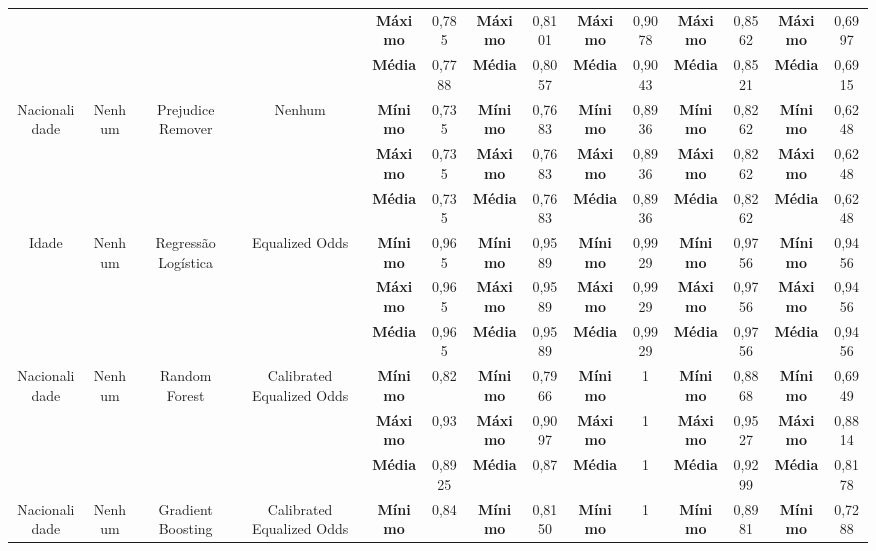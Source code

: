 \documentclass[Portugues,Final]{ic-tese-v3}
\begin{document}
\begin{table}[H]
\begin{center}
{\begin{tabular}{c|c|c|c|c|c|c|c|c|c|c|c|c|c}
             & & & & \textbf{Máximo} & 0,785 & \textbf{Máximo} & 0,8101 & \textbf{Máximo} & 0,9078 & \textbf{Máximo} & 0,8562 & \textbf{Máximo} & 0,6997 \\
             & & & & \textbf{Média} & 0,7788 & \textbf{Média} & 0,8057 & \textbf{Média} & 0,9043 & \textbf{Média} & 0,8521 & \textbf{Média} & 0,6915 \\
            \hline
            \multirow{3}{*}{Nacionalidade} & \multirow{3}{*}{Nenhum} & \multirow{3}{*}{Prejudice Remover} & \multirow{3}{*}{Nenhum} & \textbf{Mínimo} & 0,735 & \textbf{Mínimo} & 0,7683 & \textbf{Mínimo} & 0,8936 & \textbf{Mínimo} & 0,8262 & \textbf{Mínimo} & 0,6248 \\
             & & & & \textbf{Máximo} & 0,735 & \textbf{Máximo} & 0,7683 & \textbf{Máximo} & 0,8936 & \textbf{Máximo} & 0,8262 & \textbf{Máximo} & 0,6248 \\
             & & & & \textbf{Média} & 0,735 & \textbf{Média} & 0,7683 & \textbf{Média} & 0,8936 & \textbf{Média} & 0,8262 & \textbf{Média} & 0,6248 \\
            \hline
            \multirow{3}{*}{Idade} & \multirow{3}{*}{Nenhum} & \multirow{3}{*}{Regressão Logística} & \multirow{3}{*}{Equalized Odds} & \textbf{Mínimo} & 0,965 & \textbf{Mínimo} & 0,9589 & \textbf{Mínimo} & 0,9929 & \textbf{Mínimo} & 0,9756 & \textbf{Mínimo} & 0,9456 \\
             & & & & \textbf{Máximo} & 0,965 & \textbf{Máximo} & 0,9589 & \textbf{Máximo} & 0,9929 & \textbf{Máximo} & 0,9756 & \textbf{Máximo} & 0,9456 \\
             & & & & \textbf{Média} & 0,965 & \textbf{Média} & 0,9589 & \textbf{Média} & 0,9929 & \textbf{Média} & 0,9756 & \textbf{Média} & 0,9456 \\
            \hline
            \multirow{3}{*}{Nacionalidade} & \multirow{3}{*}{Nenhum} & \multirow{3}{*}{Random Forest} & \multirow{3}{*}{Calibrated Equalized Odds} & \textbf{Mínimo} & 0,82 & \textbf{Mínimo} & 0,7966 & \textbf{Mínimo} & 1 & \textbf{Mínimo} & 0,8868 & \textbf{Mínimo} & 0,6949 \\
             & & & & \textbf{Máximo} & 0,93 & \textbf{Máximo} & 0,9097 & \textbf{Máximo} & 1 & \textbf{Máximo} & 0,9527 & \textbf{Máximo} & 0,8814 \\
             & & & & \textbf{Média} & 0,8925 & \textbf{Média} & 0,87 & \textbf{Média} & 1 & \textbf{Média} & 0,9299 & \textbf{Média} & 0,8178 \\
            \hline
            \multirow{3}{*}{Nacionalidade} & \multirow{3}{*}{Nenhum} & \multirow{3}{*}{Gradient Boosting} & \multirow{3}{*}{Calibrated Equalized Odds} & \textbf{Mínimo} & 0,84 & \textbf{Mínimo} & 0,8150 & \textbf{Mínimo} & 1 & \textbf{Mínimo} & 0,8981 & \textbf{Mínimo} & 0,7288 \\

\end{tabular}}
\end{center}
\end{table}
\end{document}
